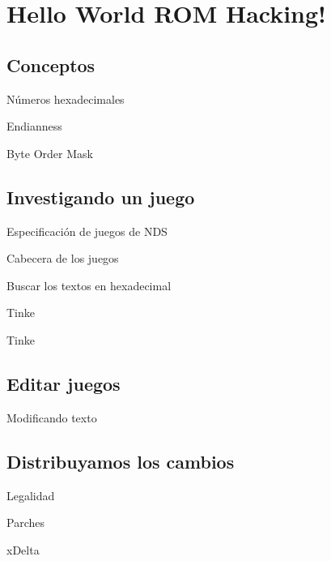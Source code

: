 \section{Hello World ROM Hacking!}
\subsection{Conceptos}
\begin{frame}{Números hexadecimales}
\end{frame}

\begin{frame}{Endianness}
\end{frame}

\begin{frame}{Byte Order Mask}
\end{frame}

\subsection{Investigando un juego}
\begin{frame}{Especificación de juegos de NDS}
\end{frame}

\begin{frame}{Cabecera de los juegos}
\end{frame}

\begin{frame}{Buscar los textos en hexadecimal}
\end{frame}

\begin{frame}{Tinke}
\end{frame}

\begin{frame}{Tinke}
\end{frame}

\subsection{Editar juegos}
\begin{frame}{Modificando texto}
\end{frame}

\subsection{Distribuyamos los cambios}
\begin{frame}{Legalidad}
\end{frame}

\begin{frame}{Parches}
\end{frame}

\begin{frame}{xDelta}
\end{frame}
